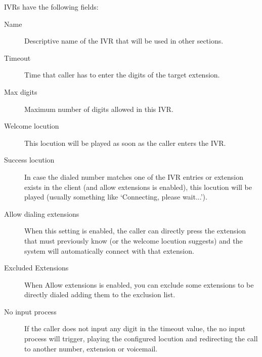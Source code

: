 \documentclass[letterpaper,10pt,english]{sphinxmanual}
\begin{document}
IVRs have the following fields:
\begin{description}
\item[{Name}] \leavevmode{}\label{administration_portal/client/vpbx/routing_endpoints/ivrs:term-name}
Descriptive name of the IVR that will be used in other sections.

\item[{Timeout}] \leavevmode{}\label{administration_portal/client/vpbx/routing_endpoints/ivrs:term-timeout}
Time that caller has to enter the digits of the target extension.

\item[{Max digits}] \leavevmode{}\label{administration_portal/client/vpbx/routing_endpoints/ivrs:term-max-digits}
Maximum number of digits allowed in this IVR.

\item[{Welcome locution}] \leavevmode{}\label{administration_portal/client/vpbx/routing_endpoints/ivrs:term-welcome-locution}
This locution will be played as soon as the caller enters the IVR.

\item[{Success locution}] \leavevmode{}\label{administration_portal/client/vpbx/routing_endpoints/ivrs:term-success-locution}
In case the dialed number matches one of the IVR entries or extension
exists in the client (and allow extensions is enabled), this locution
will be played (usually something like `Connecting, please wait...').

\item[{Allow dialing extensions}] \leavevmode{}\label{administration_portal/client/vpbx/routing_endpoints/ivrs:term-allow-dialing-extensions}
When this setting is enabled, the caller can directly press the extension
that must previously know (or the welcome locution suggests) and the system
will automatically connect with that extension.

\item[{Excluded Extensions}] \leavevmode{}\label{administration_portal/client/vpbx/routing_endpoints/ivrs:term-excluded-extensions}
When Allow extensions is enabled, you can exclude some extensions to be
directly dialed adding them to the exclusion list.

\item[{No input process}] \leavevmode{}\label{administration_portal/client/vpbx/routing_endpoints/ivrs:term-no-input-process}
If the caller does not input any digit in the timeout value, the
no input process will trigger, playing the configured locution and
redirecting the call to another number, extension or voicemail.


\end{description}
\end{document}
